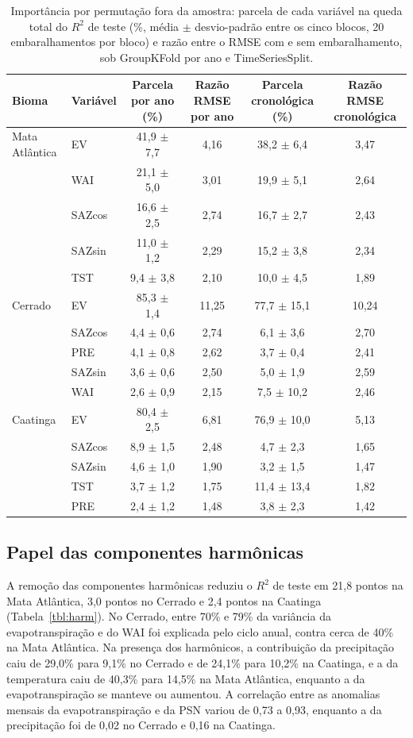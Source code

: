 \documentclass[a4paper,fleqn]{cas-sc}
\begin{document}
\begin{table}[htbp]
\caption{Importância por permutação fora da amostra: parcela de cada variável na queda total do $R^2$ de teste (\%, média $\pm$ desvio-padrão entre os cinco blocos, 20 embaralhamentos por bloco) e razão entre o RMSE com e sem embaralhamento, sob GroupKFold por ano e TimeSeriesSplit.}\label{tbl:perm}
\footnotesize
\begin{tabular*}{\tblwidth}{@{}LLCCCC@{}}
\toprule
Bioma & Variável & Parcela por ano (\%) & Razão RMSE por ano & Parcela cronológica (\%) & Razão RMSE cronológica \\
\midrule
Mata Atlântica & EV & 41,9 $\pm$ 7,7 & 4,16 & 38,2 $\pm$ 6,4 & 3,47 \\
 & WAI & 21,1 $\pm$ 5,0 & 3,01 & 19,9 $\pm$ 5,1 & 2,64 \\
 & SAZcos & 16,6 $\pm$ 2,5 & 2,74 & 16,7 $\pm$ 2,7 & 2,43 \\
 & SAZsin & 11,0 $\pm$ 1,2 & 2,29 & 15,2 $\pm$ 3,8 & 2,34 \\
 & TST & 9,4 $\pm$ 3,8 & 2,10 & 10,0 $\pm$ 4,5 & 1,89 \\
Cerrado & EV & 85,3 $\pm$ 1,4 & 11,25 & 77,7 $\pm$ 15,1 & 10,24 \\
 & SAZcos & 4,4 $\pm$ 0,6 & 2,74 & 6,1 $\pm$ 3,6 & 2,70 \\
 & PRE & 4,1 $\pm$ 0,8 & 2,62 & 3,7 $\pm$ 0,4 & 2,41 \\
 & SAZsin & 3,6 $\pm$ 0,6 & 2,50 & 5,0 $\pm$ 1,9 & 2,59 \\
 & WAI & 2,6 $\pm$ 0,9 & 2,15 & 7,5 $\pm$ 10,2 & 2,46 \\
Caatinga & EV & 80,4 $\pm$ 2,5 & 6,81 & 76,9 $\pm$ 10,0 & 5,13 \\
 & SAZcos & 8,9 $\pm$ 1,5 & 2,48 & 4,7 $\pm$ 2,3 & 1,65 \\
 & SAZsin & 4,6 $\pm$ 1,0 & 1,90 & 3,2 $\pm$ 1,5 & 1,47 \\
 & TST & 3,7 $\pm$ 1,2 & 1,75 & 11,4 $\pm$ 13,4 & 1,82 \\
 & PRE & 2,4 $\pm$ 1,2 & 1,48 & 3,8 $\pm$ 2,3 & 1,42 \\
\bottomrule
\end{tabular*}
\end{table}

\subsection{Papel das componentes harmônicas}

A remoção das componentes harmônicas reduziu o $R^2$ de teste em 21,8 pontos na Mata Atlântica, 3,0 pontos no Cerrado e 2,4 pontos na Caatinga (Tabela~\ref{tbl:harm}). No Cerrado, entre 70\% e 79\% da variância da evapotranspiração e do WAI foi explicada pelo ciclo anual, contra cerca de 40\% na Mata Atlântica. Na presença dos harmônicos, a contribuição da precipitação caiu de 29,0\% para 9,1\% no Cerrado e de 24,1\% para 10,2\% na Caatinga, e a da temperatura caiu de 40,3\% para 14,5\% na Mata Atlântica, enquanto a da evapotranspiração se manteve ou aumentou. A correlação entre as anomalias mensais da evapotranspiração e da PSN variou de 0,73 a 0,93, enquanto a da precipitação foi de 0,02 no Cerrado e 0,16 na Caatinga.
\end{document}
